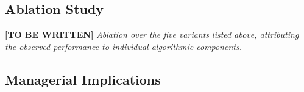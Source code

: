 \documentclass[preprint,12pt,authoryear]{elsarticle}
\begin{document}

\subsection{Ablation Study}
\label{subsec:ablation}

%
%

\textbf{[TO BE WRITTEN]} \textit{Ablation over the five variants listed above, attributing the observed performance to individual algorithmic components.}



\subsection{Managerial Implications}
\label{subsec:managerial}
\end{document}
